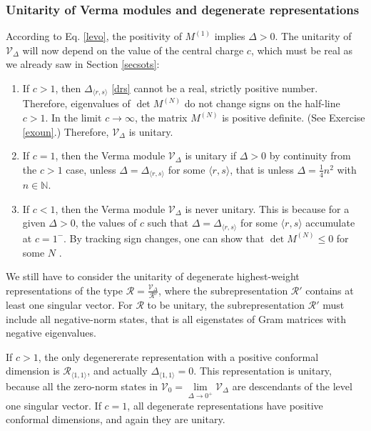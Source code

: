 \documentclass[12pt, a4paper, notitlepage, twoside]{report}
\numberwithin{equation}{section}
\theoremstyle{break}
\begin{document}
\subsubsection{Unitarity of Verma modules and degenerate representations}

According to Eq. \eqref{levo}, the positivity of $M^{(1)}$ implies $\Delta >0$. 
The unitarity of $\mathcal{V}_\Delta$ will now depend on the value of the central charge $c$, which must be real 
as we already saw in Section \ref{secsots}:
\begin{enumerate}
 \item 
If $c > 1$, then $\Delta_{\langle r,s \rangle}$ \eqref{drs} cannot be a real, strictly positive number. 
Therefore, eigenvalues of $\det M^{(N)}$ do not change signs on the half-line $c > 1$.
In the limit $c \to \infty$, the matrix $M^{(N)}$ is positive definite. (See Exercise \ref{exoun}.) 
Therefore, $\mathcal{V}_\Delta$ is unitary. 
\item 
If $c=1$, then the Verma module $\mathcal{V}_\Delta$ is unitary if $\Delta > 0$ by continuity from the $c>1$ case, unless $\Delta=\Delta_{\langle r,s \rangle}$ for some $\langle r,s \rangle$, that is unless $\Delta =\frac14 n^2$ with $n\in {\mathbb{N}}$.
\item 
If $c<1$, then the Verma module $\mathcal{V}_\Delta$ is never unitary. 
This is because for a given $\Delta>0$, the values of $c$ such that $\Delta = \Delta_{\langle r,s \rangle}$ for some $\langle r,s \rangle$ accumulate at $c=1^-$. By tracking sign changes, one can show that $\det M^{(N)}\leq 0$ for some $N$ \cite{fms97}. 
\end{enumerate}

We still have to consider the unitarity of degenerate highest-weight representations of the type $\mathcal{R}=\frac{\mathcal{V}_\Delta}{\mathcal{R}'}$, where the subrepresentation $\mathcal{R}'$ contains at least one singular vector. 
For $\mathcal{R}$ to be unitary, the subrepresentation $\mathcal{R}'$ must include all negative-norm states, that is all eigenstates of Gram matrices with negative eigenvalues.

If $c > 1$, the only degenererate representation with a positive conformal dimension is $\mathcal{R}_{\langle 1,1 \rangle}$, and actually $\Delta_{\langle 1,1 \rangle}=0$. This representation is unitary, because all the zero-norm states in $\mathcal{V}_0 = \underset{\Delta \to 0^+}{\lim} \mathcal{V}_\Delta$ are descendants of the level one singular vector. If $c=1$, all degenerate representations have positive conformal dimensions, and again they are unitary.
\end{document}
